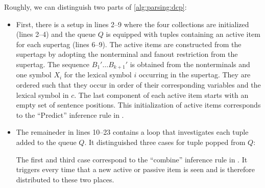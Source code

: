 \documentclass[../document.tex]{subfiles}
\begin{document}
    Roughly, we can distinguish two parts of \cref{alg:parsing:dcp}:
    \begin{itemize}
        \item First, there is a setup in lines 2--9 where the four collections are initialized (lines 2--4) and the queue \(Q\) is equipped with tuples containing an active item for each supertag (lines 6--9).
            The active items are constructed from the supertags by adopting the  nonterminal and fanout restriction from the supertag.
            The sequence \(B_1' \ldots B_{k+1}'\) is obtained from the  nonterminals and one symbol \(X_i\) for the lexical symbol \(i\) occurring in the supertag.
            They are ordered such that they occur in order of their corresponding variables and the lexical symbol in \(c\).
            The last component of each active item starts with an empty set of sentence positions.
            This initialization of active items corresponds to the ``Predict'' inference rule in .
        \item
            The remaineder in lines 10--23 contains a loop that investigates each tuple added to the queue \(Q\).
            It distinguished three cases for tuple popped from \(Q\):
            The first and third case correspond to the ``combine'' inference rule in .
            It triggers every time that a new active or passive item is seen and is therefore distributed to these two places.
    \end{itemize}
    
\end{document}
